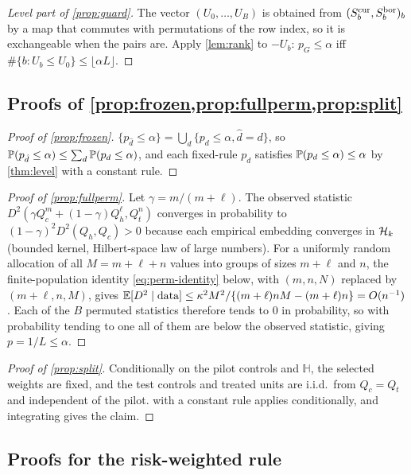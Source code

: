 \documentclass[11pt,a4paper]{article}
\begin{document}
\begin{proof}[Level part of \cref{prop:guard}]
The vector $(U_0,\dots,U_B)$ is obtained from $(S^{\rm cur}_b,S^{\rm bor}_b)_{b}$ by a map that commutes with permutations of the row index, so it is exchangeable when the pairs are. Apply \cref{lem:rank} to $-U_b$: $p_G\le\alpha$ iff $\#\{b:U_b\le U_0\}\le\lfloor\alpha L\rfloor$.
\end{proof}

\subsection{Proofs of \texorpdfstring{\cref{prop:frozen,prop:fullperm,prop:split}}{Propositions 3.3, 3.4 and 3.11}}

\begin{proof}[Proof of \cref{prop:frozen}]
$\{p_{\hat d}\le\alpha\}=\bigcup_{d}\{p_d\le\alpha,\hat d=d\}$, so $\P(p_{\hat d}\le\alpha)\le\sum_d\P(p_d\le\alpha)$, and each fixed-rule $p_d$ satisfies $\P(p_d\le\alpha)\le\alpha$ by \cref{thm:level} with a constant rule.
\end{proof}

\begin{proof}[Proof of \cref{prop:fullperm}]
Let $\gamma=m/(m+\ell)$. The observed statistic $D^2(\gamma Q_c^m+(1-\gamma)Q_h^\ell,Q_t^n)$ converges in probability to $(1-\gamma)^2D^2(Q_h,Q_c)>0$ because each empirical embedding converges in $\Hk$ (bounded kernel, Hilbert-space law of large numbers). For a uniformly random allocation of all $M=m+\ell+n$ values into groups of sizes $m+\ell$ and $n$, the finite-population identity \eqref{eq:perm-identity} below, with $(m,n,N)$ replaced by $(m+\ell,n,M)$, gives $\E[D^2\mid\text{data}]\le\kappa^2M^2/\{(m+\ell)nM-(m+\ell)n\}=O(n^{-1})$. Each of the $B$ permuted statistics therefore tends to $0$ in probability, so with probability tending to one all of them are below the observed statistic, giving $p=1/L\le\alpha$.
\end{proof}

\begin{proof}[Proof of \cref{prop:split}]
Conditionally on the pilot controls and $\mathbb H$, the selected weights are fixed, and the test controls and treated units are i.i.d.\ from $Q_c=Q_t$ and independent of the pilot.  with a constant rule applies conditionally, and integrating gives the claim.
\end{proof}

\subsection{Proofs for the risk-weighted rule}
\end{document}

